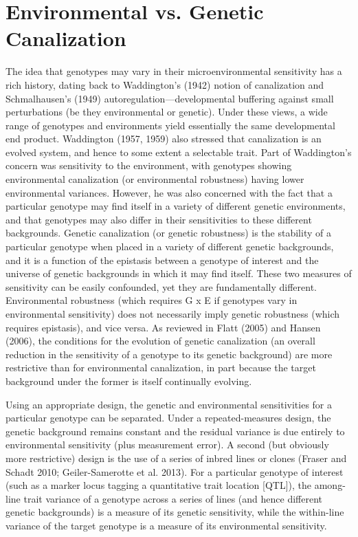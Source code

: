 \documentclass{article}
\begin{document}
\section{Environmental vs. Genetic Canalization}
The idea that genotypes may vary in their microenvironmental sensitivity has a rich history, dating back to Waddington's (1942) notion of canalization and Schmalhausen's (1949) autoregulation—developmental buffering against small perturbations (be they environmental or genetic). Under these views, a wide range of genotypes and environments yield essentially the same developmental end product. Waddington (1957, 1959) also stressed that canalization is an evolved system, and hence to some extent a selectable trait. Part of Waddington's concern was sensitivity to the environment, with genotypes showing environmental canalization (or environmental robustness) having lower environmental variances. However, he was also concerned with the fact that a particular genotype may find itself in a variety of different genetic environments, and that genotypes may also differ in their sensitivities to these different backgrounds. Genetic canalization (or genetic robustness) is the stability of a particular genotype when placed in a variety of different genetic backgrounds, and it is a function of the epistasis between a genotype of interest and the universe of genetic backgrounds in which it may find itself. These two measures of sensitivity can be easily confounded, yet they are fundamentally different. Environmental robustness (which requires G x E if genotypes vary in environmental sensitivity) does not necessarily imply genetic robustness (which requires epistasis), and vice versa. As reviewed in Flatt (2005) and Hansen (2006), the conditions for the evolution of genetic canalization (an overall reduction in the sensitivity of a genotype to its genetic background) are more restrictive than for environmental canalization, in part because the target background under the former is itself continually evolving.

Using an appropriate design, the genetic and environmental sensitivities for a particular genotype can be separated. Under a repeated-measures design, the genetic background remains constant and the residual variance is due entirely to environmental sensitivity (plus measurement error). A second (but obviously more restrictive) design is the use of a series of inbred lines or clones (Fraser and Schadt 2010; Geiler-Samerotte et al. 2013). For a particular genotype of interest (such as a marker locus tagging a quantitative trait location [QTL]), the among-line trait variance of a genotype across a series of lines (and hence different genetic backgrounds) is a measure of its genetic sensitivity, while the within-line variance of the target genotype is a measure of its environmental sensitivity.
\end{document}

